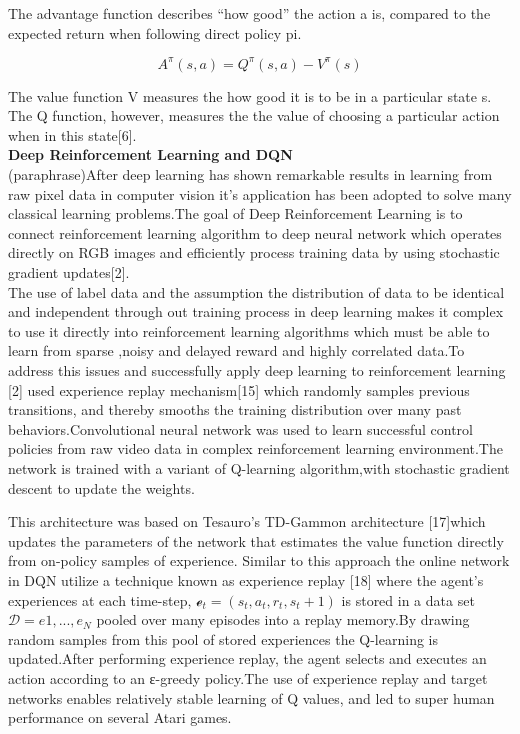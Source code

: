 The advantage function  describes “how good” the action a is, compared to the expected return when following direct policy pi.

\begin{equation}
    A^\pi (s,a) = Q^\pi(s,a)- V^\pi(s)
    \end{equation}

The value function V measures the how good it is to be in a particular state s. The Q function, however, measures the the value of choosing a particular action when in this state[6].\\

\textbf{Deep Reinforcement Learning and DQN}\\

(paraphrase)After deep learning  has shown remarkable results in learning from raw pixel data in computer vision it's application has been adopted to solve many classical learning problems.The goal of Deep Reinforcement Learning is to connect reinforcement learning algorithm to deep neural network which operates directly on RGB images and efficiently process training data by using stochastic gradient updates[2].\\

The use of label data and the assumption the distribution of data to be identical and independent through out training process in deep learning makes it complex to use it directly into reinforcement learning algorithms which must be able to learn from sparse ,noisy and delayed reward and highly correlated data.To address this issues and successfully apply deep learning to reinforcement learning [2] used experience replay mechanism[15] which randomly samples previous transitions, and thereby smooths the training distribution over many past behaviors.Convolutional neural network was used to  learn successful control policies from raw video data in complex reinforcement learning environment.The network is trained with a variant of Q-learning algorithm,with stochastic gradient descent to update the weights.

This architecture was based on Tesauro’s TD-Gammon architecture [17]which updates the parameters of the network that estimates the value function directly from on-policy samples of experience. Similar to this approach the online network  in DQN utilize a technique known as experience replay [18] where the agent’s experiences at each time-step, $\mathcal e_t = (s_t,a_t,r_t,s_t+1)$ is stored in a data set $\mathcal D = e1 , ..., e_N $ pooled over many episodes into a replay memory.By drawing random samples from this pool of stored experiences  the Q-learning is updated.After performing experience replay, the agent selects and executes an action according to an ε-greedy policy.The use of experience replay and target networks enables relatively stable learning of Q values, and led to super human performance on several Atari games.\\

